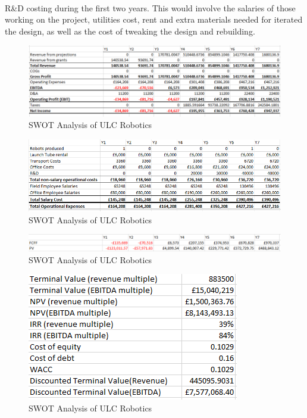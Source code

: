 \documentclass[11pt]{article}		%
\begin{document}
			    \\
			    R\&D costing during the first two years. This would involve the salaries of those working on the project, utilities cost, rent and extra materials needed for iterated the design, as well as the cost of tweaking the design and rebuilding.
			    
		        \begin{figure}[h]
					\centering
					\includegraphics[scale=1]{P&L_v1.PNG}
					\caption{SWOT Analysis of ULC Robotics}
					\label{forecast_PL}
				\end{figure}
		            
		      	\begin{figure}[h]
					\centering
					\includegraphics[scale=1]{costs v1.PNG}
					\caption{SWOT Analysis of ULC Robotics}
					\label{forecast_costs}
				\end{figure}
				
		 		\begin{figure}[h]
					\centering
					\includegraphics[scale=1]{FCF v1.PNG}
					\caption{SWOT Analysis of ULC Robotics}
					\label{forecast_FCF}
				\end{figure}
				
				\begin{figure}[h]
					\centering
					\includegraphics[scale=1]{IRR v1.PNG}
					\caption{SWOT Analysis of ULC Robotics}
					\label{forecast_IRR}
				\end{figure}
	        
\end{document}
